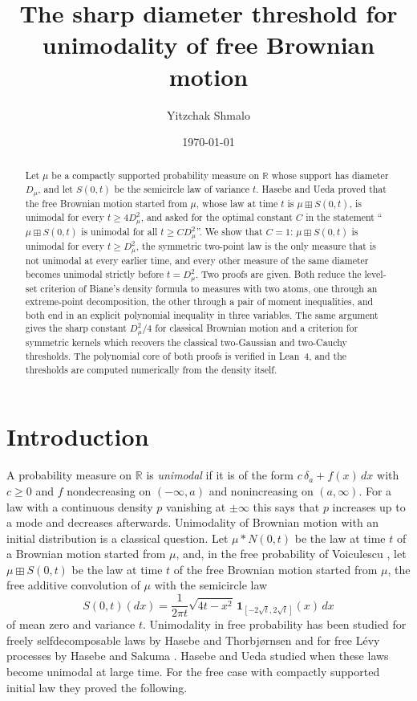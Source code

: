 \documentclass[11pt]{amsart}
\title[Sharp unimodality threshold for free Brownian motion]{The sharp diameter threshold for unimodality of free Brownian motion}
\author{Yitzchak Shmalo}
\date{\today}
\theoremstyle{definition}
\newcommand{\R}{\mathbb{R}}
\newcommand{\bp}{\boxplus}
\begin{document}
\begin{abstract}
Let $\mu$ be a compactly supported probability measure on $\R$ whose support has diameter $D_\mu$, and let $S(0,t)$ be the semicircle law of variance $t$. Hasebe and Ueda proved that the free Brownian motion started from $\mu$, whose law at time $t$ is $\mu\bp S(0,t)$, is unimodal for every $t\ge 4D_\mu^2$, and asked for the optimal constant $C$ in the statement ``$\mu\bp S(0,t)$ is unimodal for all $t\ge C D_\mu^2$''. We show that $C=1$: $\mu\bp S(0,t)$ is unimodal for every $t\ge D_\mu^2$, the symmetric two-point law is the only measure that is not unimodal at every earlier time, and every other measure of the same diameter becomes unimodal strictly before $t=D_\mu^2$. Two proofs are given. Both reduce the level-set criterion of Biane's density formula to measures with two atoms, one through an extreme-point decomposition, the other through a pair of moment inequalities, and both end in an explicit polynomial inequality in three variables. The same argument gives the sharp constant $D_\mu^2/4$ for classical Brownian motion and a criterion for symmetric kernels which recovers the classical two-Gaussian and two-Cauchy thresholds. The polynomial core of both proofs is verified in Lean~4, and the thresholds are computed numerically from the density itself.
\end{abstract}

\maketitle

\section{Introduction}

A probability measure on $\R$ is \emph{unimodal} if it is of the form $c\,\delta_a+f(x)\,dx$ with $c\ge 0$ and $f$ nondecreasing on $(-\infty,a)$ and nonincreasing on $(a,\infty)$. For a law with a continuous density $p$ vanishing at $\pm\infty$ this says that $p$ increases up to a mode and decreases afterwards. Unimodality of Brownian motion with an initial distribution is a classical question. Let $\mu*N(0,t)$ be the law at time $t$ of a Brownian motion started from $\mu$, and, in the free probability of Voiculescu \cite{Voiculescu86, NicaSpeicher}, let $\mu\bp S(0,t)$ be the law at time $t$ of the free Brownian motion started from $\mu$, the free additive convolution of $\mu$ with the semicircle law
\[
S(0,t)(dx)=\frac{1}{2\pi t}\sqrt{4t-x^2}\,\mathbf 1_{[-2\sqrt t,2\sqrt t]}(x)\,dx
\]
of mean zero and variance $t$. Unimodality in free probability has been studied for freely selfdecomposable laws by Hasebe and Thorbj\o rnsen \cite{HasebeThorbjornsen} and for free L\'evy processes by Hasebe and Sakuma \cite{HasebeSakuma}. Hasebe and Ueda \cite{HasebeUeda} studied when these laws become unimodal at large time. For the free case with compactly supported initial law they proved the following.
\end{document}
